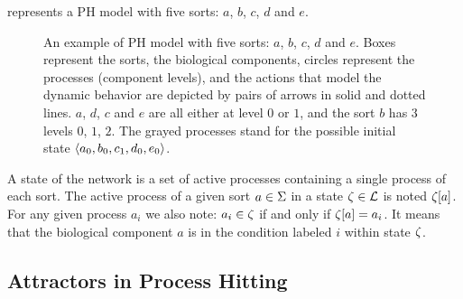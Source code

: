\begin{example}
 represents a PH model with five sorts: $a$, $b$, $c$, $d$ and $e$.
\begin{figure}[!h]
  \centering
  \caption{\label{fig:ph}
An example of PH model with five sorts: $a$, $b$, $c$, $d$ and $e$. Boxes represent the sorts, the biological components, circles represent the processes (component levels), and the actions that model the dynamic behavior are depicted by pairs of arrows in solid and dotted lines. $a$, $d$, $c$ and $e$ are all either at level $0$ or $1$, and the sort $b$ has $3$ levels $0$, $1$, $2$. The grayed processes stand for the possible initial state $\mbox{$\langle a_0, b_0, c_1, d_0, e_0 \rangle$}$.
  }
\end{figure}

\end{example}

A state of the network is a set of active processes containing a single process of each sort.
The active process of a given sort $a \in \Sigma$ in a state $\zeta \in \mathcal{L}$
is noted ${\zeta[a]}$.
For any given process $a_i$ we also note: $a_i \in \zeta$ if and only if ${\zeta[a]} = a_i$. It means that the biological component $a$ is in the condition labeled $i$ within state $\zeta$.

\subsection{Attractors in Process Hitting}


